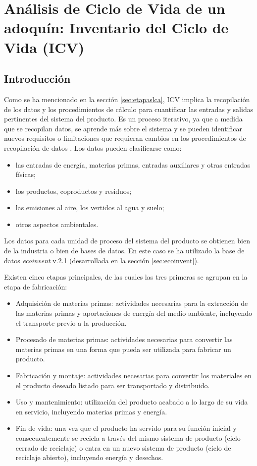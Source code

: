 \chapter{Análisis de Ciclo de Vida de un adoquín: Inventario del Ciclo de Vida (ICV)}\label{cap:inventario}

\section{Introducción}\label{sec:intro_icv}
Como se ha mencionado en la sección \ref{sec:etapaslca}, ICV implica la recopilación de los datos y los procedimientos de cálculo para cuantificar las entradas y salidas pertinentes del sistema del producto. Es un proceso iterativo, ya que a medida que se recopilan datos, se aprende más sobre el sistema y se pueden identificar nuevos requisitos o limitaciones que requieran cambios en los procedimientos de recopilación de datos \cite{iso14040}. Los datos pueden clasificarse como:

\begin{itemize}
  \item las entradas de energía, materias primas, entradas auxiliares y otras entradas físicas;
  \item los productos, coproductos y residuos;
  \item las emisiones al aire, los vertidos al agua y suelo;
  \item otros aspectos ambientales.
\end{itemize}

Los datos para cada unidad de proceso del sistema del producto se obtienen bien de la industria o bien de bases de datos. En este caso se ha utilizado la base de datos \textit{ecoinvent} v.2.1 (desarrollada en la sección \ref{sec:ecoinvent}).

Existen cinco etapas principales, de las cuales las tres primeras se agrupan en la etapa de fabricación:
\begin{itemize}
  \item Adquisición de materias primas: actividades necesarias para la extracción de las materias primas y aportaciones de energía del medio ambiente, incluyendo el transporte previo a la producción.
  \item Procesado de materias primas: actividades necesarias para convertir las materias primas en una forma que pueda ser utilizada para fabricar un producto.
  \item Fabricación y montaje: actividades necesarias para convertir los materiales en el producto deseado listado para ser transportado y distribuido.
  \item Uso y mantenimiento: utilización del producto acabado a lo largo de su vida en servicio, incluyendo materias primas y energía.
  \item Fin de vida: una vez que el producto ha servido para su función inicial y consecuentemente se recicla a través del mismo sistema de producto (ciclo cerrado de reciclaje) o entra en un nuevo sistema de producto (ciclo de reciclaje abierto), incluyendo energía y desechos.
\end{itemize}

